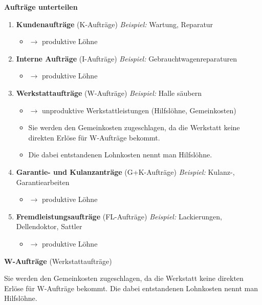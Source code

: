 \textbf{Aufträge unterteilen}

\begin{enumerate}
\item
  \textbf{Kundenaufträge} (K-Aufträge) \emph{Beispiel:} Wartung,
  Reparatur

  \begin{itemize}
  \item
    $\to$ produktive Löhne
  \end{itemize}
\item
  \textbf{Interne Aufträge} (I-Aufträge) \emph{Beispiel:}
  Gebrauchtwagenreparaturen

  \begin{itemize}
  \item
    $\to$ produktive Löhne
  \end{itemize}
\item
  \textbf{Werkstattaufträge} (W-Aufträge) \emph{Beispiel:} Halle säubern

  \begin{itemize}
  \item
    $\to$ unproduktive Werkstattleistungen (Hilfslöhne, Gemeinkosten)
  \item
    Sie werden den Gemeinkosten zugeschlagen, da die Werkstatt keine
    direkten Erlöse für W-Aufträge bekommt.
  \item
    Die dabei entstandenen Lohnkosten nennt man Hilfslöhne.
  \end{itemize}
\item
  \textbf{Garantie- und Kulanzanträge} (G+K-Aufträge) \emph{Beispiel:}
  Kulanz-, Garantiearbeiten

  \begin{itemize}
  \item
    $\to$ produktive Löhne
  \end{itemize}
\item
  \textbf{Fremdleistungsaufträge} (FL-Aufträge) \emph{Beispiel:}
  Lackierungen, Dellendoktor, Sattler

  \begin{itemize}
  \item
    $\to$ produktive Löhne
  \end{itemize}
\end{enumerate}

\textbf{W-Aufträge} (Werkstattaufträge)

Sie werden den Gemeinkosten zugeschlagen, da die Werkstatt keine
direkten Erlöse für W-Aufträge bekommt. Die dabei entstandenen
Lohnkosten nennt man Hilfslöhne.

